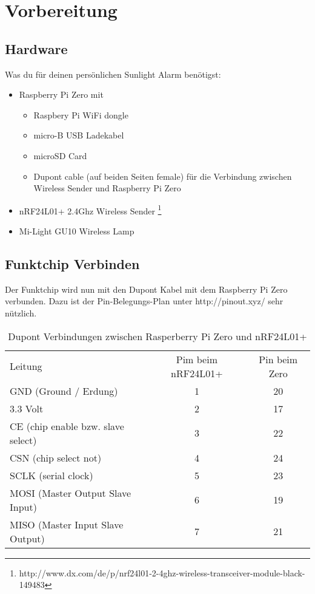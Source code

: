 

\newcommand{\SUBJECT}{Dokumentation}
\newcommand{\TITLE}{Sunlight Alarm}
\newcommand{\SECONDAUTHOR}{Fabian Hauser}



\section{Vorbereitung}

\subsection{Hardware}
Was du für deinen persönlichen Sunlight Alarm benötigst:
\begin{itemize}
	\item Raspberry Pi Zero mit 
	\begin{itemize}
		\item Raspbery Pi WiFi dongle
		\item micro-B USB Ladekabel
		\item microSD Card
		\item Dupont cable (auf beiden Seiten female) für die Verbindung zwischen Wireless Sender und Raspberry Pi Zero
	\end{itemize}
	\item nRF24L01+ 2.4Ghz Wireless Sender \footnote{http://www.dx.com/de/p/nrf24l01-2-4ghz-wireless-transceiver-module-black-149483}
	\item Mi-Light GU10 Wireless Lamp
\end{itemize}

\subsection{Funktchip Verbinden}
Der Funktchip wird nun mit den Dupont Kabel mit dem Raspberry Pi Zero verbunden. Dazu ist der Pin-Belegungs-Plan unter http://pinout.xyz/ sehr nützlich.
\begin{table}[h]
\centering
\begin{tabu} to \linewidth {l c c}
	\toprule
	Leitung & Pim beim nRF24L01+ & Pin beim Zero \\
	GND (Ground / Erdung) & 1 & 20 \\
	3.3 Volt & 2 & 17 \\
	CE (chip enable bzw. slave select) & 3 & 22 \\
	CSN (chip select not) & 4 & 24 \\
	SCLK (serial clock) & 5 & 23 \\
	MOSI (Master Output Slave Input) & 6 & 19 \\
	MISO (Master Input Slave Output) & 7 & 21 \\
	\bottomrule
	\end{tabu}
	\caption{Dupont Verbindungen zwischen Rasperberry Pi Zero und nRF24L01+}
\end{table}

